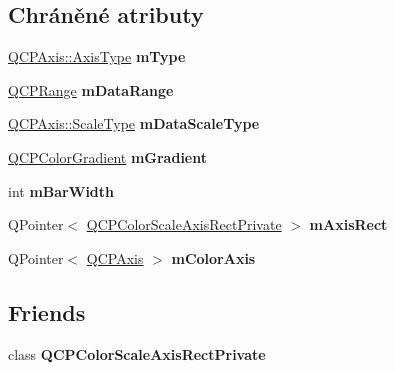\subsection*{Chráněné atributy}
\begin{DoxyCompactItemize}
\item 
\hypertarget{classQCPColorScale_a7d47ed4ab76f38e50164e9d77fe33789}{}\hyperlink{classQCPAxis_ae2bcc1728b382f10f064612b368bc18a}{Q\+C\+P\+Axis\+::\+Axis\+Type} {\bfseries m\+Type}\label{classQCPColorScale_a7d47ed4ab76f38e50164e9d77fe33789}

\item 
\hypertarget{classQCPColorScale_a5d4853feb32cd0077bb2b871687c844b}{}\hyperlink{classQCPRange}{Q\+C\+P\+Range} {\bfseries m\+Data\+Range}\label{classQCPColorScale_a5d4853feb32cd0077bb2b871687c844b}

\item 
\hypertarget{classQCPColorScale_a2754d6a78736f64a241e333fbd955372}{}\hyperlink{classQCPAxis_a36d8e8658dbaa179bf2aeb973db2d6f0}{Q\+C\+P\+Axis\+::\+Scale\+Type} {\bfseries m\+Data\+Scale\+Type}\label{classQCPColorScale_a2754d6a78736f64a241e333fbd955372}

\item 
\hypertarget{classQCPColorScale_ae195a385032066b5c46cc3301af58922}{}\hyperlink{classQCPColorGradient}{Q\+C\+P\+Color\+Gradient} {\bfseries m\+Gradient}\label{classQCPColorScale_ae195a385032066b5c46cc3301af58922}

\item 
\hypertarget{classQCPColorScale_a409d2ab78dff1f92da5e6acfb062e811}{}int {\bfseries m\+Bar\+Width}\label{classQCPColorScale_a409d2ab78dff1f92da5e6acfb062e811}

\item 
\hypertarget{classQCPColorScale_a6e37f7d49cd614dc50ef1caae60461b9}{}Q\+Pointer$<$ \hyperlink{classQCPColorScaleAxisRectPrivate}{Q\+C\+P\+Color\+Scale\+Axis\+Rect\+Private} $>$ {\bfseries m\+Axis\+Rect}\label{classQCPColorScale_a6e37f7d49cd614dc50ef1caae60461b9}

\item 
\hypertarget{classQCPColorScale_a2efbc90fd31898fe05d2b74a8422b1d5}{}Q\+Pointer$<$ \hyperlink{classQCPAxis}{Q\+C\+P\+Axis} $>$ {\bfseries m\+Color\+Axis}\label{classQCPColorScale_a2efbc90fd31898fe05d2b74a8422b1d5}

\end{DoxyCompactItemize}
\subsection*{Friends}
\begin{DoxyCompactItemize}
\item 
\hypertarget{classQCPColorScale_a1441d8c09d7227c0c29a8d0a96d55bfe}{}class {\bfseries Q\+C\+P\+Color\+Scale\+Axis\+Rect\+Private}\label{classQCPColorScale_a1441d8c09d7227c0c29a8d0a96d55bfe}

\end{DoxyCompactItemize}
